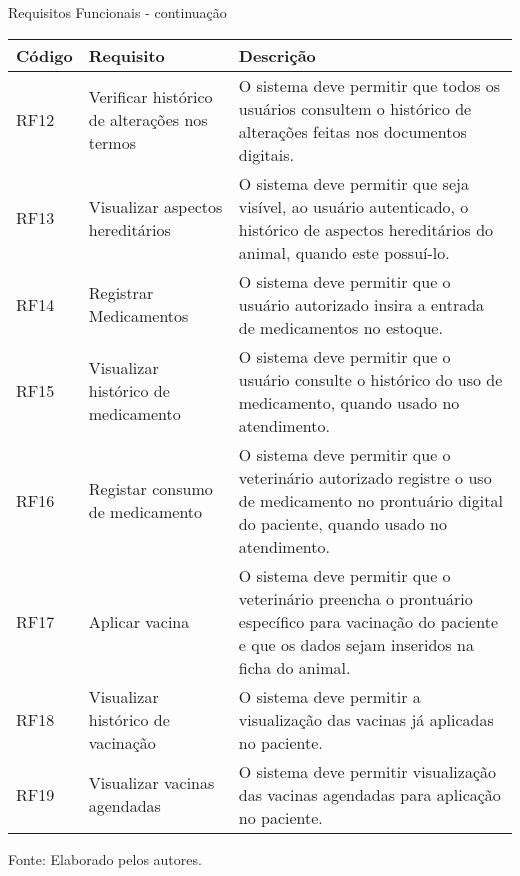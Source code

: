 \documentclass[
    12pt,               %
    openright,          %
    oneside,
    a4paper,            %
    BIBLATEX,           %
    TODO,               %
    english,            %
    brazil              %
    ]{ifsp-spo-inf-ctds}
\begin{document}
            \begin{center}
                \begin{quadro}[H]
                \caption{Requisitos Funcionais - continuação}
                \begin{tabulary}{1.0\textwidth}{|p{5em}|p{8em}|p{18em}|}
                \hline
                Código & Requisito & Descrição\\
                \hline
                RF12 & Verificar histórico de alterações nos termos & O sistema deve permitir que todos os usuários consultem o histórico de alterações feitas nos documentos digitais.\\
                \hline
                RF13 & Visualizar aspectos hereditários & O sistema deve permitir que seja visível, ao usuário autenticado, o histórico de aspectos hereditários do animal, quando este possuí-lo.\\
                \hline
                RF14 & Registrar Medicamentos & O sistema deve permitir que o usuário autorizado insira a entrada de medicamentos no estoque.\\
                \hline
                RF15 & Visualizar histórico de medicamento & O sistema deve permitir que o usuário consulte o histórico do uso de medicamento, quando usado no atendimento.\\
                \hline
                RF16 & Registar consumo de medicamento & O sistema deve permitir que o veterinário autorizado registre o uso de medicamento no prontuário digital do paciente, quando usado no atendimento.\\ 
                \hline
                RF17 & Aplicar vacina & O sistema deve permitir que o veterinário preencha o prontuário específico para vacinação do paciente e que os dados sejam inseridos na ficha do animal.\\
                \hline
                RF18 & Visualizar histórico de vacinação & O sistema deve permitir a visualização das vacinas já aplicadas no paciente.\\
                \hline
                RF19 & Visualizar vacinas agendadas & O sistema deve permitir visualização das vacinas agendadas para aplicação no paciente.\\
                \hline
                \end{tabulary}
                \label{tab:req_func2}
                \centering

                \footnotesize {Fonte: Elaborado pelos autores.}
                \end{quadro}
            \end{center}
\end{document}
